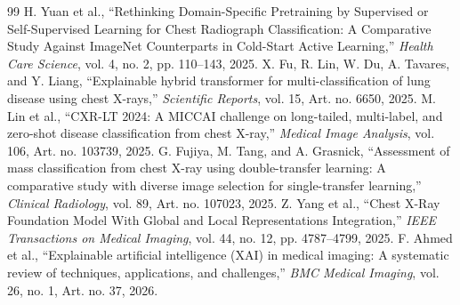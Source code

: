 \documentclass[12pt, oneside]{book}
\begin{document}
\begin{thebibliography}{99}
H. Yuan et al., ``Rethinking Domain-Specific Pretraining by Supervised or Self-Supervised Learning for Chest Radiograph Classification: A Comparative Study Against ImageNet Counterparts in Cold-Start Active Learning,'' \textit{Health Care Science}, vol. 4, no. 2, pp. 110--143, 2025.
X. Fu, R. Lin, W. Du, A. Tavares, and Y. Liang, ``Explainable hybrid transformer for multi-classification of lung disease using chest X-rays,'' \textit{Scientific Reports}, vol. 15, Art. no. 6650, 2025.
M. Lin et al., ``CXR-LT 2024: A MICCAI challenge on long-tailed, multi-label, and zero-shot disease classification from chest X-ray,'' \textit{Medical Image Analysis}, vol. 106, Art. no. 103739, 2025.
G. Fujiya, M. Tang, and A. Grasnick, ``Assessment of mass classification from chest X-ray using double-transfer learning: A comparative study with diverse image selection for single-transfer learning,'' \textit{Clinical Radiology}, vol. 89, Art. no. 107023, 2025.
Z. Yang et al., ``Chest X-Ray Foundation Model With Global and Local Representations Integration,'' \textit{IEEE Transactions on Medical Imaging}, vol. 44, no. 12, pp. 4787--4799, 2025.
F. Ahmed et al., ``Explainable artificial intelligence (XAI) in medical imaging: A systematic review of techniques, applications, and challenges,'' \textit{BMC Medical Imaging}, vol. 26, no. 1, Art. no. 37, 2026.
\end{thebibliography}

\label{endmainmatter}
\end{document}
